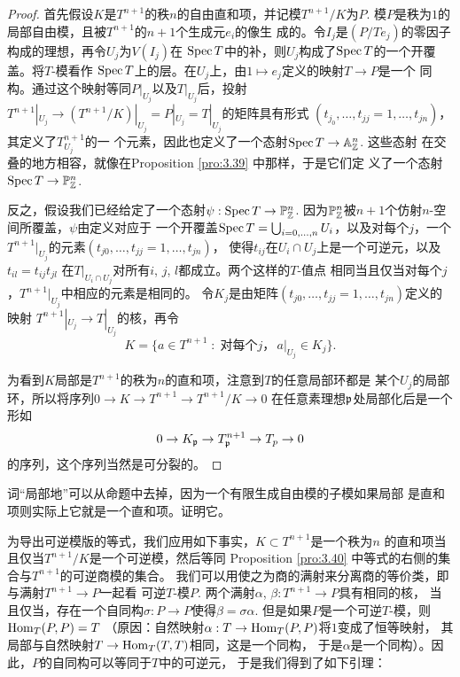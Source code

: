 \begin{proof}
	首先假设$K$是$T^{n+1}$的秩$n$的自由直和项，并记模$T^{n+1}/K$为$P$. 
	模$P$是秩为$1$的局部自由模，且被$T^{n+1}$的$n+1$个生成元$e_i$的像生
	成的。令$I_j$是$(P/Te_j)$的零因子构成的理想，再令$U_j$为$V(I_j)$在
	$\operatorname{Spec} T$中的补，则$U_j$构成了$\operatorname{Spec} T$的一个开覆盖。将$T$-模看作
	$\operatorname{Spec} T$上的层。在$U_j$上，由$1\mapsto e_j$定义的映射$T\to P$是一个
	同构。通过这个映射等同$P|_{U_j}$以及$T|_{U_j}$后，投射$T^{n+1}|_{U_j}
	\to (T^{n+1}/K)|_{U_j}=P|_{U_j}=T|_{U_j}$的矩阵具有形式
	$(t_{j_0},\dots,t_{jj}=1,\dots,t_{jn})$，其定义了$T^{n+1}_{U_j}$的一
	个元素，因此也定义了一个态射$\operatorname{Spec} T\to \mathbb A_{\mathbb{Z}}^n$. 这些态射
	在交叠的地方相容，就像在Proposition \ref{pro:3.39} 中那样，于是它们定
	义了一个态射$\operatorname{Spec} T\to \mathbb P_{\mathbb{Z}}^n$.

	反之，假设我们已经给定了一个态射$\psi:\operatorname{Spec} T\to \mathbb P_{\mathbb{Z}}^n$. 
	因为$\mathbb P_{\mathbb{Z}}^n$被$n+1$个仿射$n$-空间所覆盖，$\psi$由定义对应于
	一个开覆盖$\operatorname{Spec} T=\bigcup_{i=0,\dots,n}U_i$，以及对每个$j$，一个
	$T^{n+1}|_{U_j}$的元素$(t_{j0},\dots,t_{jj}=1,\dots,t_{jn})$，
	使得$t_{ij}$在$U_i\cap U_j$上是一个可逆元，以及$t_{il}=t_{ij}t_{jl}$
	在$T|_{U_i\cap U_j}$对所有$i$, $j$, $l$都成立。两个这样的$T$-值点
	相同当且仅当对每个$j$，$T^{n+1}|_{U_j}$中相应的元素是相同的。%
	令$K_j$是由矩阵$(t_{j0},\dots,t_{jj}=1,\dots,t_{jn})$定义的映射
	$T^{n+1}|_{U_j}\to T|_{U_j}$的核，再令
	\[
	K=\{a\in T^{n+1}\;:\; \text{对每个$j$，}\, a|_{U_j}\in K_j\}.
	\]

	为看到$K$局部是$T^{n+1}$的秩为$n$的直和项，注意到$T$的任意局部环都是
	某个$U_j$的局部环，所以将序列$0\to K\to T^{n+1}\to T^{n+1}/K\to 0$
	在任意素理想$\mathfrak{p}$处局部化后是一个形如
	\[
		0\to K_{\mathfrak{p}}\to T^{n+1}_{\mathfrak{p}} \to T_p\to 0
	\]
	的序列，这个序列当然是可分裂的。
\end{proof}

\begin{exe}\label{exe:3.41}
	词“局部地”可以从命题中去掉，因为一个有限生成自由模的子模如果局部
	是直和项则实际上它就是一个直和项。证明它。
\end{exe}

为导出可逆模版的等式，我们应用如下事实，$K\subset T^{n+1}$是一个秩为$n$
的直和项当且仅当$T^{n+1}/K$是一个可逆模，然后等同
Proposition \ref{pro:3.40} 中等式的右侧的集合与$T^{n+1}$的可逆商模的集合。
我们可以用使之为商的满射来分离商的等价类，即与满射$T^{n+1}\to P$一起看
可逆$T$-模$P$. 两个满射$\alpha$, $\beta:T^{n+1}\to P$具有相同的核，
当且仅当，存在一个自同构$\sigma:P\to P$使得$\beta=\sigma\alpha$. 
但是如果$P$是一个可逆$T$-模，则$\operatorname{Hom}_T(P,P)=T$
（原因：自然映射$\alpha:T\to \operatorname{Hom}_T(P,P)$将$1$变成了恒等映射，
其局部与自然映射$T\to \operatorname{Hom}_T(T,T)$相同，这是一个同构，
于是$\alpha$是一个同构）。因此，$P$的自同构可以等同于$T$中的可逆元，
于是我们得到了如下引理：

